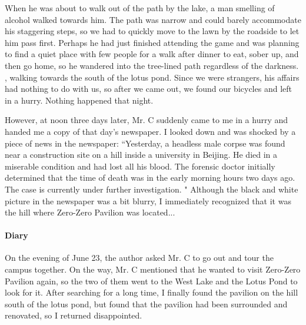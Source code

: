When he was about to walk out of the path by the lake, a man smelling of
alcohol walked towards him.  The path was narrow and could barely accommodate
his staggering steps, so we had to quickly move to the lawn by the roadside to
let him pass first.  Perhaps he had just finished attending the game and was
planning to find a quiet place with few people for a walk after dinner to eat,
sober up, and then go home, so he wandered into the tree-lined path regardless
of the darkness. , walking towards the south of the lotus pond.  Since we were
strangers, his affairs had nothing to do with us, so after we came out, we
found our bicycles and left in a hurry.  Nothing happened that night.

However, at noon three days later, Mr. C suddenly came to me in a hurry and
handed me a copy of that day's newspaper.  I looked down and was shocked by a
piece of news in the newspaper: “Yesterday, a headless male corpse was found
near a construction site on a hill inside a university in Beijing. He died in a
miserable condition and had lost all his blood.  The forensic doctor initially
determined that the time of death was in the early morning hours two days ago.
The case is currently under further investigation. " Although the black and
white picture in the newspaper was a bit blurry, I immediately recognized that
it was the hill where Zero-Zero Pavilion was located...

\vfill

\paragraph{Diary} On the evening of June 23, the author asked Mr. C to go out
and tour the campus together. On the way, Mr. C mentioned that he wanted to
visit Zero-Zero Pavilion again, so the two of them went to the West Lake and the
Lotus Pond to look for it.  After searching for a long time, I finally found
the pavilion on the hill south of the lotus pond, but found that the pavilion
had been surrounded and renovated, so I returned disappointed.
